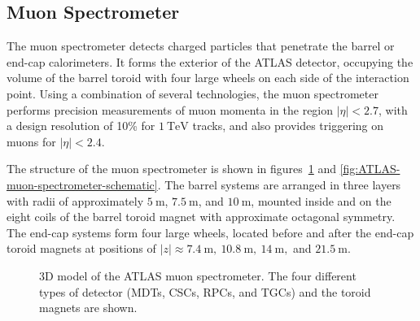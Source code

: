 \subsection{Muon Spectrometer}\label{sec:ATLAS-muon-spectrometer}
The muon spectrometer detects charged particles that penetrate the barrel or end-cap calorimeters. It forms the exterior of the ATLAS detector, occupying the volume of the barrel toroid with four large wheels on each side of the interaction point. Using a combination of several technologies, the muon spectrometer performs precision measurements of muon momenta in the region $|\eta|<2.7$, with a design resolution of 10\% for $\SI{1}{\tera\electronvolt}$ tracks, and also provides triggering on muons for $|\eta|<2.4$. 

The structure of the muon spectrometer is shown in figures~\ref{fig:ATLAS-muon-spectrometer-layout} and \ref{fig:ATLAS-muon-spectrometer-schematic}. The barrel systems are arranged in three layers with radii of approximately $\SI{5}{\meter}$, $\SI{7.5}{\meter}$, and $\SI{10}{\meter}$, mounted inside and on the eight coils of the barrel toroid magnet with approximate octagonal symmetry. The end-cap systems form four large wheels, located before and after the end-cap toroid magnets at positions of $|z|\approx \SI{7.4}{\meter},\ \SI{10.8}{\meter},\ \SI{14}{\meter},$ and $\SI{21.5}{\meter}$. 

\begin{figure}[htbp]
	\centering
	\caption{3D model of the ATLAS muon spectrometer. The four different types of detector (MDTs, CSCs, RPCs, and TGCs) and the toroid magnets are shown.}
	\label{fig:ATLAS-muon-spectrometer-layout}
\end{figure}

